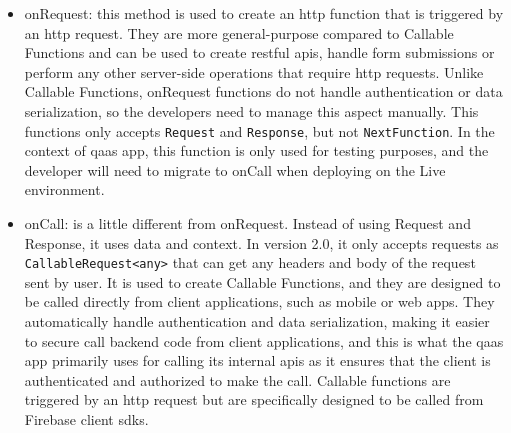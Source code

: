 \begin{multicols}{2}
      \begin{itemize}
            \item onRequest: this method is used to create an \acrshort{http} function that is triggered by an \acrshort{http}
                  request. They are more general-purpose compared to Callable Functions and can be used to create \acrshort{rest}ful
                  \acrshort{api}s, handle form submissions or perform any other server-side operations that require \acrshort{http}
                  requests. Unlike Callable Functions, onRequest functions do not handle authentication or data serialization, so
                  the developers need to manage this aspect manually. This functions only accepts \texttt{Request} and
                  \texttt{Response}, but not \texttt{NextFunction}. In the context of \acrshort{qaas} app, this function is only used
                  for testing purposes, and the developer will need to migrate to onCall when deploying on the Live environment.
            \item onCall: is a little different from onRequest. Instead of using Request and Response, it uses data and context.
                  In version 2.0, it only accepts requests as \texttt{CallableRequest<any>} that can get any headers and body
                  of the request sent by user. It is used to create Callable Functions, and they are designed to be called directly
                  from client applications, such as mobile or web apps. They automatically handle authentication and data serialization,
                  making it easier to secure call backend code from client applications, and this is what the \acrshort{qaas} app
                  primarily uses for calling its internal \acrshort{api}s as it ensures that the client is authenticated and authorized
                  to make the call. Callable functions are triggered by an \acrshort{http} request but are specifically designed to be
                  called from Firebase client \acrshort{sdk}s.

      \end{itemize}
\end{multicols}

